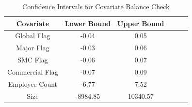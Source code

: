 \documentclass{article}
\begin{document}
\begin{table}[htp]
\centering
\caption{Confidence Intervals for Covariate Balance Check}\medskip
\begin{tabular}{cccccc}
\toprule
Covariate             & Lower Bound            & Upper Bound   \\
\midrule
Global Flag           & -0.04                  & 0.05        \\
Major Flag            & -0.03                  & 0.06        \\
SMC Flag              & -0.06                  & 0.07        \\
Commercial Flag       & -0.07                  & 0.09        \\
Employee Count        & -6.77                  & 7.52        \\
Size                  & -8984.85               & 10340.57        \\
\bottomrule
\end{tabular}
\end{table}
\end{document}
